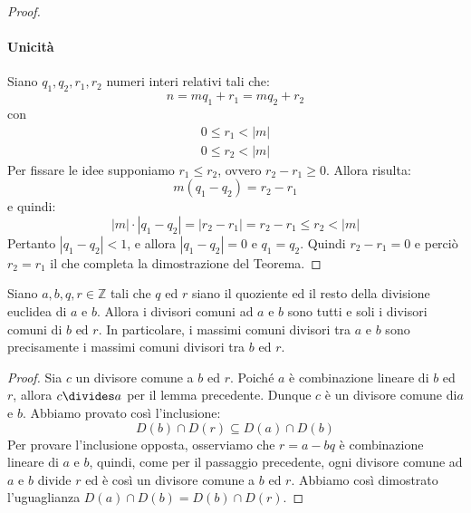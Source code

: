 \begin{proof}
		\paragraph{Unicità}	Siano $q_{1},q_{2},r_{1},r_{2}$ numeri interi relativi tali che: $$n=mq_{1}+r_{1}=mq_{2}+r_{2}$$ con
		\begin{displaymath}
			\begin{array}{l}
				0 \leq r_{1} < |m| \\
				0 \leq r_{2} < |m|
			\end{array}
		\end{displaymath}
		Per fissare le idee supponiamo $r_{1} \leq r_{2}$, ovvero $r_{2}-r_{1} \geq 0$. Allora risulta:
		\begin{displaymath}
			m(q_{1}-q_{2})=r_{2}-r_{1}
		\end{displaymath}
		e quindi:
		\begin{displaymath}
			|m| \cdot |q_{1}-q_{2}| = |r_{2}-r_{1}| = r_{2}-r_{1} \leq r_{2} < |m|
		\end{displaymath}
		Pertanto $|q_{1}-q_{2}|<1$, e allora $|q_{1}-q_{2}|=0$ e $q_{1}=q_{2}$. Quindi $r_{2}-r_{1}=0$ e perciò $r_{2}=r_{1}$ il che completa la dimostrazione del Teorema.
\end{proof}

\begin{lemmabox}\label{lemma:mcd}
	Siano $a,b,q,r \in \mathbb{Z}$ tali che $q$ ed $r$ siano il quoziente ed il resto della divisione euclidea di $a$ e $b$. Allora i divisori comuni ad $a$ e $b$ sono tutti e soli i divisori comuni di $b$ ed $r$. In particolare, i massimi comuni divisori tra $a$ e $b$ sono precisamente i massimi comuni divisori tra $b$ ed $r$.
\end{lemmabox}

\begin{proof}
	Sia $c$ un divisore comune a $b$ ed $r$. Poiché $a$ è combinazione lineare di $b$ ed $r$, allora $c \divides a$ per il lemma precedente. Dunque $c$ è un divisore comune di$a$ e $b$. Abbiamo provato così l'inclusione:
	\begin{displaymath}
		D(b) \cap D(r) \subseteq D(a) \cap D(b)
	\end{displaymath}
	Per provare l'inclusione opposta, osserviamo che $r= a-bq$ è combinazione lineare di $a$ e $b$, quindi, come per il passaggio precedente, ogni divisore comune ad $a$ e $b$ divide $r$ ed è così un divisore comune a $b$ ed $r$. Abbiamo così dimostrato l'uguaglianza $D(a)\cap D(b) = D(b) \cap D(r)$.
\end{proof}

